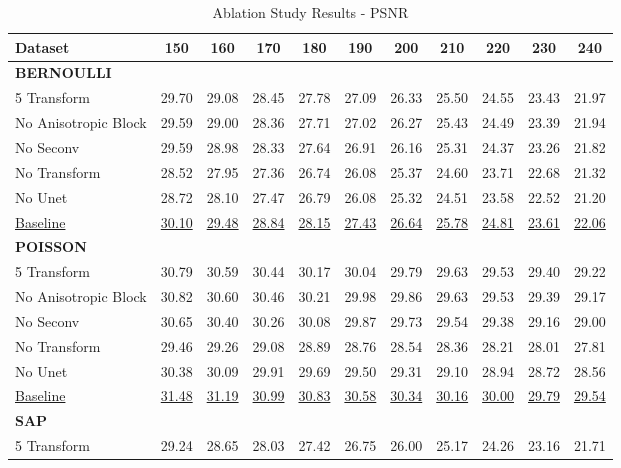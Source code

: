 \begin{table}[!hbt]
    \centering
    \caption{Ablation Study Results - PSNR}
    \begin{tabular}{lcccccccccc}
    \toprule
    Dataset & 150 & 160 & 170 & 180 & 190 & 200 & 210 & 220 & 230 & 240 \\
    \midrule
    \textbf{BERNOULLI} \\
    5 Transform & 29.70 & 29.08 & 28.45 & 27.78 & 27.09 & 26.33 & 25.50 & 24.55 & 23.43 & 21.97 \\
    No Anisotropic Block & 29.59 & 29.00 & 28.36 & 27.71 & 27.02 & 26.27 & 25.43 & 24.49 & 23.39 & 21.94 \\
    No Seconv & 29.59 & 28.98 & 28.33 & 27.64 & 26.91 & 26.16 & 25.31 & 24.37 & 23.26 & 21.82 \\
    No Transform & 28.52 & 27.95 & 27.36 & 26.74 & 26.08 & 25.37 & 24.60 & 23.71 & 22.68 & 21.32 \\
    No Unet & 28.72 & 28.10 & 27.47 & 26.79 & 26.08 & 25.32 & 24.51 & 23.58 & 22.52 & 21.20 \\
    \underline{Baseline} & \underline{30.10} & \underline{29.48} & \underline{28.84} & \underline{28.15} & \underline{27.43} & \underline{26.64} & \underline{25.78} & \underline{24.81} & \underline{23.61} & \underline{22.06} \\
    \midrule
    \textbf{POISSON} \\
    5 Transform & 30.79 & 30.59 & 30.44 & 30.17 & 30.04 & 29.79 & 29.63 & 29.53 & 29.40 & 29.22 \\
    No Anisotropic Block & 30.82 & 30.60 & 30.46 & 30.21 & 29.98 & 29.86 & 29.63 & 29.53 & 29.39 & 29.17 \\
    No Seconv & 30.65 & 30.40 & 30.26 & 30.08 & 29.87 & 29.73 & 29.54 & 29.38 & 29.16 & 29.00 \\
    No Transform & 29.46 & 29.26 & 29.08 & 28.89 & 28.76 & 28.54 & 28.36 & 28.21 & 28.01 & 27.81 \\
    No Unet & 30.38 & 30.09 & 29.91 & 29.69 & 29.50 & 29.31 & 29.10 & 28.94 & 28.72 & 28.56 \\
    \underline{Baseline} & \underline{31.48} & \underline{31.19} & \underline{30.99} & \underline{30.83} & \underline{30.58} & \underline{30.34} & \underline{30.16} & \underline{30.00} & \underline{29.79} & \underline{29.54} \\
    \midrule
    \textbf{SAP} \\
    5 Transform & 29.24 & 28.65 & 28.03 & 27.42 & 26.75 & 26.00 & 25.17 & 24.26 & 23.16 & 21.71 \\

\end{tabular}
\end{table}
